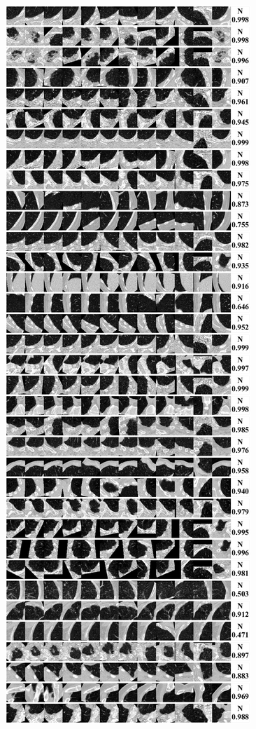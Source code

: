 \documentclass[onecolumn]{IEEEtran}
\begin{document}
\begin{figure}[H]
{\includegraphics[width=0.45\columnwidth]{./images/elcap-nodules-nonnodule5}
}
\end{figure}

\newpage
\begin{figure}[H]
\centering
{}
\end{figure}
\end{document}
